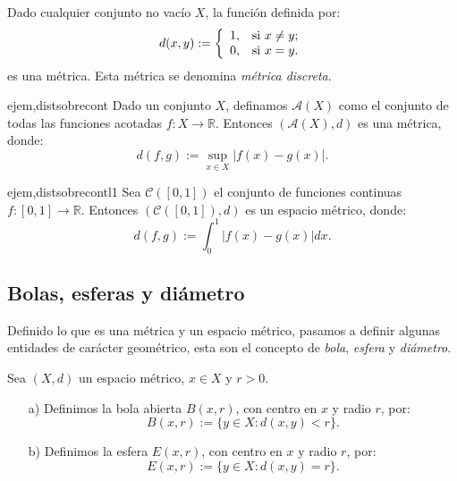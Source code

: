 \begin{ejemplo}{} Dado cualquier conjunto no vacío $X$, la
función definida por:
\[
	d(x,y):=\left\{
\begin{array}{ll}
	1, & \hbox{si $x\neq y$;} \\
	0, & \hbox{si $x=y$.} \\
\end{array}
\right.
\]
es una métrica. Esta métrica se denomina \emph{métrica
discreta}.
\end{ejemplo}

\begin{ejemplo}{ejem,distsobrecont} Dado un conjunto $X$,
definamos $\mathcal{A}(X)$
como el conjunto de todas las funciones acotadas $f:X\rightarrow
\mathbb{R}$. Entonces $(\mathcal{A}(X),d)$ es una métrica,
donde:
\begin{equation}\label{convunifmet}
	d(f,g):=\sup\limits_{x\in X}|f(x)-g(x)|.
\end{equation}
\end{ejemplo}

\begin{ejemplo}{ejem,distsobrecontl1} Sea $\mathcal{C}([0,1])$
el conjunto de funciones
continuas $f:[0,1]\rightarrow\mathbb{R}$. Entonces\linebreak
$(\mathcal{C}([0,1]),d)$ es un espacio métrico, donde:
\begin{equation}\label{l1metint}
	d(f,g):=\int_0^1|f(x)-g(x)|dx.
\end{equation}
\end{ejemplo}
\subsection{Bolas, esferas y diámetro}
Definido lo que es una métrica y un espacio métrico, pasamos a
definir algunas entidades de carácter geométrico, esta son el
concepto de \emph{bola}, \emph{esfera} y \emph{diámetro}.   

\begin{definicion}{} Sea $(X,d)$ un espacio métrico, $x\in X$ y
$r>0$.
\begin{itemize}
\item[a)]Definimos la bola abierta $B(x,r)$, con centro en $x$ y radio
$r$, por:
\[B(x,r):=\{y\in X:d(x,y)<r\}.\]
\item[b)]Definimos la esfera $E(x,r)$, con centro en $x$ y radio
$r$, por:
\[E(x,r):=\{y\in X:d(x,y)=r\}.\]
\end{itemize}
\end{definicion}

